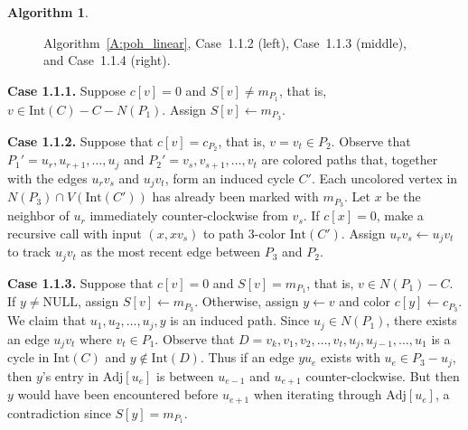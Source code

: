 \documentclass[12pt,letterpaper]{article}
\theoremstyle{plain}
\theoremstyle{definition}
\theoremstyle{break}
\newtheorem{algorithm}[lemma]{Algorithm}     %
\begin{document}
\begin{algorithm}
\begin{figure}[ht]
\begin{center}
\caption{Algorithm~\ref{A:poh_linear}, Case~1.1.2 (left), Case~1.1.3 (middle),
and Case~1.1.4 (right).}\label{F:poh_linear_1}
\end{center}
\end{figure}

\textbf{Case 1.1.1.} Suppose $c[v]=0$ and $S[v]\ne m_{P_1}$, that is,
$v\in\text{Int}(C)-C-N(P_1)$. Assign $S[v]\leftarrow m_{P_3}$.

\textbf{Case 1.1.2.} Suppose that $c[v]=c_{P_2}$, that is, $v=v_t\in P_2$.
Observe that $P_1'=u_r,u_{r+1},\ldots, u_j$ and $P_2'=v_s,v_{s+1},\ldots,v_t$
are colored paths that, together with the edges $u_rv_s$ and $u_jv_t$,
form an induced cycle $C'$. Each uncolored vertex in
$N(P_3)\cap V(\text{Int}(C'))$ has already been marked with $m_{P_3}$.
Let
$x$ be the neighbor of $u_r$ immediately counter-clockwise from $v_s$.
If $c[x]=0$, make a recursive call with input $(x, xv_s)$
to path $3$-color $\text{Int}(C')$. Assign
$u_rv_s\leftarrow u_jv_t$ to track $u_jv_t$ as the most recent edge between
$P_3$ and $P_2$.

\textbf{Case 1.1.3.} Suppose that $c[v]=0$ and $S[v]=m_{P_1}$, that is,
$v\in N(P_1)-C$. If $y\ne\text{NULL}$, assign $S[v]\leftarrow m_{P_3}$.
Otherwise, assign $y\leftarrow v$ and color
$c[y]\leftarrow c_{P_3}$. We claim that $u_1,u_2,\ldots,u_j,y$ is an induced
path. Since $u_j\in N(P_1)$, there exists an edge $u_jv_t$ where $v_t\in P_1$.
Observe that $D=v_k,v_1,v_2,\ldots,v_t,u_j,u_{j-1},\ldots,u_1$ is a cycle in
$\text{Int}(C)$ and $y\not\in\text{Int}(D)$. Thus if an edge $yu_e$ exists with
$u_e\in P_3-u_j$,
then $y$'s entry in $\text{Adj}[u_e]$ is between $u_{e-1}$ and
$u_{e+1}$ counter-clockwise.
But then $y$ would have been encountered before $u_{e+1}$
when iterating through $\text{Adj}[u_e]$, a contradiction since
$S[y]=m_{P_1}$.


\end{algorithm}
\end{document}
